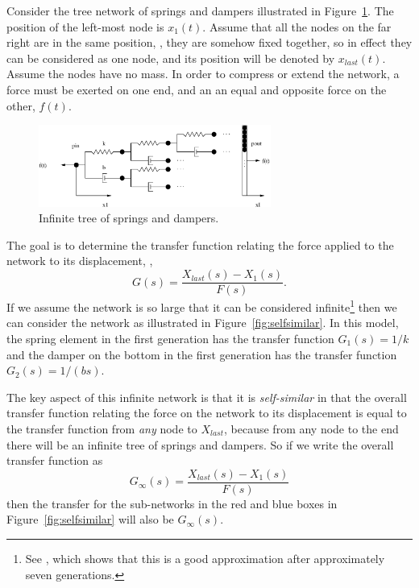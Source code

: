 \begin{example}
  Consider the tree network of springs and dampers illustrated in Figure~\ref{fig:structure}. The position of the left-most node is $x_1(t)$. Assume that all the nodes on the far right are in the same position, \ie, they are somehow fixed together, so in effect they can be considered as one node, and its position will be denoted by $x_{last}(t)$. Assume the nodes have no mass.  In order to compress or extend the network, a force must be exerted on one end, and an an equal and opposite force on the other, $f(t)$. 

  \begin{figure}
    \centering
    \includegraphics[width=3in]{figs/structure}
    \caption{Infinite tree of springs and dampers.}
    \label{fig:structure}
  \end{figure}

  The goal is to determine the transfer function relating the force applied to the network to its displacement, \ie,
\begin{equation}
  G(s) = \frac{X_{last}(s) - X_1(s)}{F(s)}.
  \label{eq:xfer}
\end{equation}
If we assume the network is so large that it can be considered infinite\footnote{See \cite{mayes}, which shows that this is a good approximation after approximately seven generations.} then we can consider the network as illustrated in Figure~\ref{fig:selfsimilar}. In this model, the spring element in the first generation has the transfer function $G_1(s) = 1/k$ and the damper on the bottom in the first generation has the transfer function $G_2(s) = 1/(b s)$.  

The key aspect of this infinite network is that it is \emph{self-similar} in that the overall transfer function relating the force on the network to its displacement is equal to the transfer function from \emph{any} node to $X_{last}$, because from any node to the end there will be an infinite tree of springs and dampers. So if we write the overall transfer function as
\begin{equation}
  G_\infty(s) = \frac{X_{last}(s) - X_1(s)}{F(s)}
\end{equation}
then the transfer for the sub-networks in the red and blue boxes in Figure~\ref{fig:selfsimilar} will also be $G_\infty(s)$. 


\end{example}
